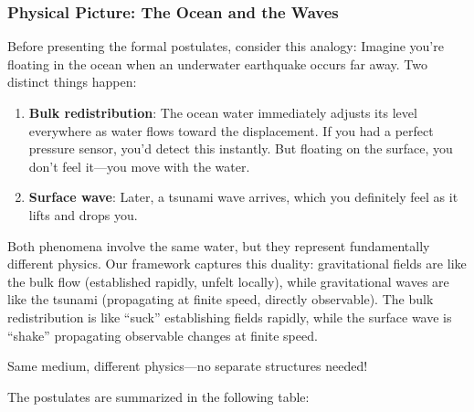 \subsubsection{Physical Picture: The Ocean and the Waves}

Before presenting the formal postulates, consider this analogy: Imagine you're floating in the ocean when an underwater earthquake occurs far away. Two distinct things happen:

\begin{enumerate}
\item \textbf{Bulk redistribution}: The ocean water immediately adjusts its level everywhere as water flows toward the displacement. If you had a perfect pressure sensor, you'd detect this instantly. But floating on the surface, you don't feel it—you move with the water.
\item \textbf{Surface wave}: Later, a tsunami wave arrives, which you definitely feel as it lifts and drops you.
\end{enumerate}

Both phenomena involve the same water, but they represent fundamentally different physics. Our framework captures this duality: gravitational fields are like the bulk flow (established rapidly, unfelt locally), while gravitational waves are like the tsunami (propagating at finite speed, directly observable). The bulk redistribution is like ``suck'' establishing fields rapidly, while the surface wave is ``shake'' propagating observable changes at finite speed.

Same medium, different physics—no separate structures needed!


The postulates are summarized in the following table:

